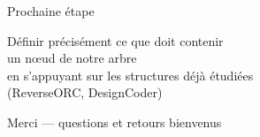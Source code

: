 \documentclass[11pt,aspectratio=169]{beamer}
\begin{document}
\begin{frame}{Prochaine étape}
  \begin{center}
  \Large Définir précisément ce que doit contenir\\ un \alert{nœud} de notre arbre
  \\[6mm]
  \small en s'appuyant sur les structures déjà étudiées \\ (ReverseORC, DesignCoder)
  \end{center}
\end{frame}

\begin{frame}[standout]
  Merci --- questions et retours bienvenus
\end{frame}
\end{document}
